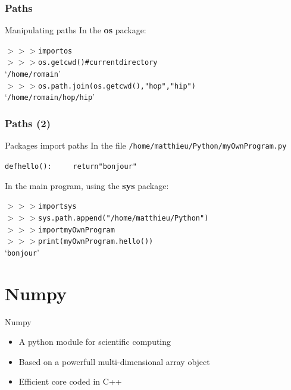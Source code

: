 \documentclass[xcolor=pdftex,dvipsnames,table,mathserif]{beamer}
\begin{document}
\begin{frame}
  \frametitle{Paths}

  \begin{block}{Manipulating paths}
    In the \textbf{os} package:
    \begin{alltt}
      $>>>$ import os\\
      $>>>$ os.getcwd() \# current directory\\
      `/home/romain'\\
      $>>>$ os.path.join( os.getcwd() , "hop" , "hip" )\\
      `/home/romain/hop/hip'
    \end{alltt}
  \end{block}

\end{frame}

\begin{frame}
  \frametitle{Paths (2)}

  \begin{block}{Packages import paths}
    In the file \texttt{/home/matthieu/Python/myOwnProgram.py}
    \begin{alltt}
      def hello():\
      ~~~~    return "bonjour"
    \end{alltt}

    In the main program, using the \textbf{sys} package:
    \begin{alltt}
      $>>>$ import sys\\
      $>>>$ sys.path.append("/home/matthieu/Python")\\
      $>>>$ import myOwnProgram\\
      $>>>$ print(myOwnProgram.hello())\\
      `bonjour'
    \end{alltt}
  \end{block}

\end{frame}


\section{Numpy}

\begin{frame}{Numpy}

\begin{itemize}
\item A python module for scientific computing
\item Based on a powerfull multi-dimensional array object
\item Efficient core coded in C++
\end{itemize}

\end{frame}
\end{document}
